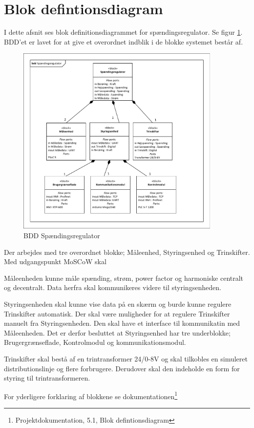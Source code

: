 
\section{Blok defintionsdiagram}

I dette afsnit ses blok definitionsdiagrammet for spændingsregulator. Se figur \ref{fig:BDDSpaendingsregulator}. BDD'et er lavet for at give et overordnet indblik i de blokke systemet består af.

\begin{figure}[htbp] %
	\centering
	\includegraphics[width=0.9\textwidth]{Figure/BDDSpaendingsregulator}
	\caption{BDD Spændingsregulator}
	\label{fig:BDDSpaendingsregulator}
\end{figure}

Der arbejdes med tre overordnet blokke; Måleenhed, Styringsenhed og Trinskifter. Med udgangspunkt MoSCoW skal 


Måleenheden kunne måle spænding, strøm, power factor og harmoniske centralt og decentralt. Data herfra skal kommunikeres videre til styringsenheden. 


Styringsenheden skal kunne vise data på en skærm og burde kunne regulere Trinskifter automatisk. Der skal være muligheder for at regulere Trinskifter manuelt fra Styringsenheden. Den skal have et interface til kommunikatin med Måleenheden. Det er derfor besluttet at Styringsenhed har tre underblokke; Brugergrænseflade, Kontrolmodul og kommunikationsmodul.


Trinskifter skal bestå af en trintransformer 24/0-8V og skal tilkobles en simuleret distributionslinje og flere forbrugere. Derudover skal den indeholde en form for styring til trintransformeren.


For yderligere forklaring af blokkene se dokumentationen\footnote{Projektdokumentation, 5.1, Blok defintionsdiagram}